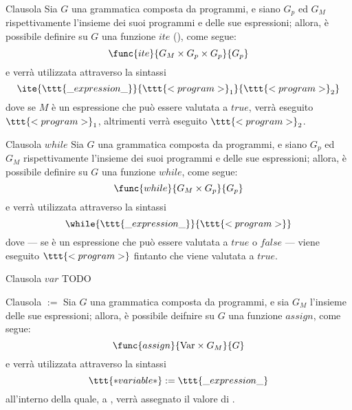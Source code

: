 \documentclass[a4paper, 12pt]{report}
\begin{document}
    \begin{frameddefn}{Clausola }
        Sia $G$ una grammatica composta da programmi, e siano $G_p$ ed $G_M$ rispettivamente l'insieme dei suoi programmi e delle sue espressioni; allora, è possibile definire su $G$ una funzione $ite$ (), come segue: $$\func{ite}{G_M \times G_p \times G_p}{G_p}$$ e verrà utilizzata attraverso la sintassi $$\ite{\ttt{\_expression\_}}{\ttt{<program>}_1}{\ttt{<program>}_2}$$ dove se $M$ è un espressione che può essere valutata a $true$, verrà eseguito $\ttt{<program>}_1$, altrimenti verrà eseguito $\ttt{<program>}_2$.
    \end{frameddefn}

    \begin{frameddefn}{Clausola $while$}
        Sia $G$ una grammatica composta da programmi, e siano $G_p$ ed $G_M$ rispettivamente l'insieme dei suoi programmi e delle sue espressioni; allora, è possibile definire su $G$ una funzione $while$, come segue: $$\func{while}{G_M \times G_p}{G_p}$$ e verrà utilizzata attraverso la sintassi $$\while{\ttt{\_expression\_}}{\ttt{<program>}}$$ dove --- se  è un espressione che può essere valutata a $true$ o $false$ --- viene eseguito $\ttt{<program>}$ fintanto che  viene valutata a $true$.
    \end{frameddefn}

    \begin{frameddefn}{Clausola $var$}
        TODO
    \end{frameddefn}

    \begin{frameddefn}{Clausola $:=$}
        Sia $G$ una grammatica composta da programmi, e sia $G_M$ l'insieme delle sue espressioni; allora, è possibile deifnire su $G$ una funzione $assign$, come segue: $$\func{assign}{\mathrm{Var} \times G_M}{G}$$ e verrà utilizzata attraverso la sintassi $$\ttt{*variable*}  := \ttt{\_expression\_}$$ all'interno della quale, a , verrà assegnato il valore di .
    \end{frameddefn}
\end{document}
